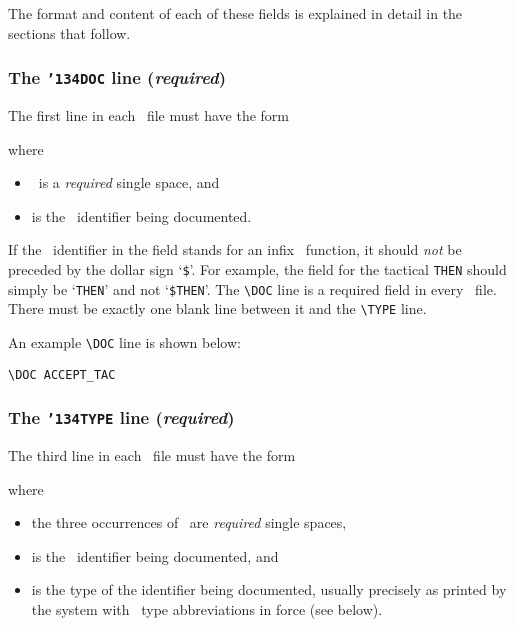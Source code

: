 The format and content of each of these fields is explained in detail in the
sections that follow.

\subsubsection{The {\tt {\char'134}DOC} line ({\it required})}

The first line in each \doc\ file must have the form

\medskip
\noindent{}
\medskip

\noindent where

\begin{itemize}

\item \vsp\ is a {\it required\/} single space, and

\item {} is the \ML\ identifier being documented.

\end{itemize}

\noindent If the \ML\ identifier in the  field stands for an infix
\ML\ function, it should {\it not\/} be preceded by the dollar sign
`{\small\verb!$!}'.  For example, the  field for the tactical
{\small\verb!THEN!} should simply be `{\small\verb!THEN!}' and not
`{\small\verb!$THEN!}'.  The {\small\verb!\DOC!} line is a required field in
every \doc\ file.  There must be exactly one blank line between it and the
{\small\verb!\TYPE!} line.

An example {\small\verb!\DOC!} line is shown below:

\begin{boxed}\begin{verbatim}
\DOC ACCEPT_TAC
\end{verbatim}\end{boxed}

\subsubsection{The {\tt {\char'134}TYPE} line ({\it required})}

The third line in each \doc\ file must have the form

\medskip
\noindent{}
\medskip

\noindent where

\begin{itemize}

\item the three occurrences of \vsp\ are {\it required\/} single spaces,
\item {} is the \ML\ identifier being documented, and
\item {} is the type of the identifier being documented, usually
precisely as printed by the system with \ML\ type abbreviations in force (see
below).

\end{itemize}

